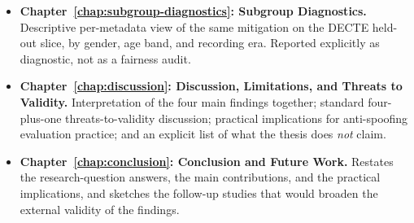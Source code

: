 \begin{itemize}
        partial-backbone fine-tune (mitigation v2), the held-out DECTE
        XTTS result, the VCTK guardrail, the post-mitigation in-domain
        sanity check, and the paired-bootstrap CI on the mitigation
        effect. Answers RQ3.
    \item \textbf{Chapter~\ref{chap:subgroup-diagnostics}: Subgroup Diagnostics.} Descriptive per-metadata
        view of the same mitigation on the DECTE held-out slice, by
        gender, age band, and recording era. Reported explicitly as
        diagnostic, not as a fairness audit.
    \item \textbf{Chapter~\ref{chap:discussion}: Discussion, Limitations, and Threats to
        Validity.} Interpretation of the four main findings together;
        standard four-plus-one threats-to-validity discussion;
        practical implications for anti-spoofing evaluation practice;
        and an explicit list of what the thesis does \emph{not} claim.
    \item \textbf{Chapter~\ref{chap:conclusion}: Conclusion and Future Work.} Restates the
        research-question answers, the main contributions, and the
        practical implications, and sketches the follow-up studies
        that would broaden the external validity of the findings.
\end{itemize}
